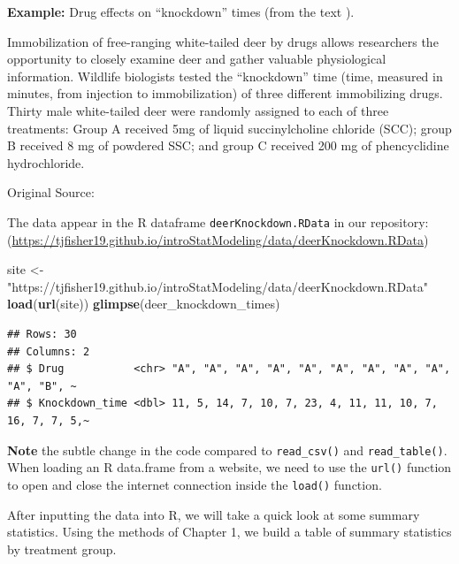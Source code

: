 \documentclass[
]{book}
\newenvironment{Shaded}{\begin{snugshade}}{\end{snugshade}}
\newcommand{\FunctionTok}[1]{\textcolor[rgb]{0.13,0.29,0.53}{\textbf{#1}}}
\newcommand{\NormalTok}[1]{#1}
\newcommand{\OtherTok}[1]{\textcolor[rgb]{0.56,0.35,0.01}{#1}}
\newcommand{\StringTok}[1]{\textcolor[rgb]{0.31,0.60,0.02}{#1}}
\begin{document}
\textbf{Example:} Drug effects on ``knockdown'' times (from the text \citet{Walpole2007}).

Immobilization of free-ranging white-tailed deer by drugs allows researchers the opportunity to closely examine deer and gather valuable physiological information.
Wildlife biologists tested the ``knockdown'' time (time, measured in minutes, from injection to immobilization) of three different immobilizing drugs.
Thirty male white-tailed deer were randomly assigned to each of three treatments: Group A received 5mg of liquid succinylcholine chloride (SCC); group B received 8 mg of powdered SSC; and group C received 200 mg of phencyclidine hydrochloride.

Original Source: \citet{Wesson1976}

The data appear in the R dataframe \texttt{deerKnockdown.RData} in our repository: (\url{https://tjfisher19.github.io/introStatModeling/data/deerKnockdown.RData})

\begin{Shaded}
\begin{Highlighting}[]
\NormalTok{site }\OtherTok{\textless{}{-}} \StringTok{"https://tjfisher19.github.io/introStatModeling/data/deerKnockdown.RData"}
\FunctionTok{load}\NormalTok{(}\FunctionTok{url}\NormalTok{(site))}
\FunctionTok{glimpse}\NormalTok{(deer\_knockdown\_times)}
\end{Highlighting}
\end{Shaded}

\begin{verbatim}
## Rows: 30
## Columns: 2
## $ Drug           <chr> "A", "A", "A", "A", "A", "A", "A", "A", "A", "A", "B", ~
## $ Knockdown_time <dbl> 11, 5, 14, 7, 10, 7, 23, 4, 11, 11, 10, 7, 16, 7, 7, 5,~
\end{verbatim}

\textbf{Note} the subtle change in the code compared to \texttt{read\_csv()} and \texttt{read\_table()}. When loading an R data.frame from a website, we need to use the \texttt{url()} function to open and close the internet connection inside the \texttt{load()} function.

After inputting the data into R, we will take a quick look at some summary statistics. Using the methods of Chapter 1, we build a table of summary statistics by treatment group.
\end{document}
